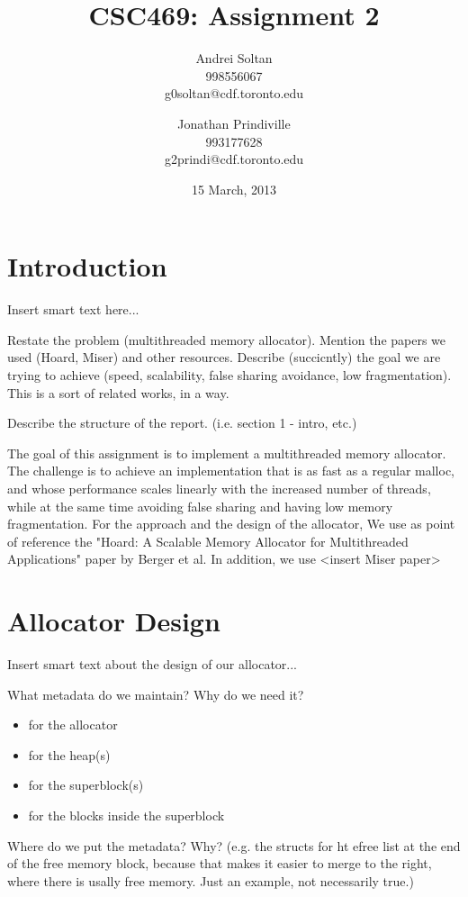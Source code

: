 \documentclass{article}
\author{Andrei Soltan\\998556067\\g0soltan@cdf.toronto.edu
\and Jonathan Prindiville\\993177628\\g2prindi@cdf.toronto.edu}
\title{CSC469: Assignment 2}
\date{15 March, 2013}
\begin{document}
\maketitle

\tableofcontents

\newpage
\section{Introduction}

Insert smart text here...

Restate the problem (multithreaded memory allocator). Mention the papers we
used (Hoard, Miser) and other resources. Describe (succicntly) the goal we are 
trying to achieve (speed, scalability, false sharing avoidance, low fragmentation). 
This is a sort of related works, in a way.

Describe the structure of the report. (i.e. section 1 - intro, etc.)

The goal of this assignment is to implement a multithreaded memory allocator.
The challenge is to achieve an implementation that is as fast as a regular 
malloc, and whose performance scales linearly with the increased number of
threads, while at the same time avoiding false sharing and having low 
memory fragmentation. For the approach and the design of the allocator, 
We use as point of reference the "Hoard: A Scalable Memory Allocator for 
Multithreaded Applications" paper by Berger et al. In addition, we use 
<insert Miser paper>

\newpage
\section{Allocator Design}

Insert smart text about the design of our allocator...

What metadata do we maintain? Why do we need it?
\begin{itemize}
	\item for the allocator
	\item for the heap(s)
	\item for the superblock(s)
	\item for the blocks inside the superblock
\end{itemize}

Where do we put the metadata? Why? (e.g. the structs for ht efree list at the 
end of the free memory block, because that makes it easier to merge to the 
right, where there is usally free memory. Just an example, not necessarily true.)
\end{document}
